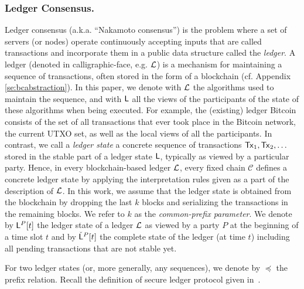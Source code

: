 \subsubsection{Ledger Consensus.}
Ledger consensus (a.k.a. ``Nakamoto consensus'') is the problem where a set of servers
(or nodes) operate continuously accepting inputs
that are called transactions and incorporate them in a public data
structure called the {\em ledger}.
A ledger (denoted in calligraphic-face, e.g. $\mathcal{L}$) is a mechanism for maintaining a sequence of transactions, often
stored in the form of a blockchain (cf. Appendix \ref{se:bcabstraction}). In this paper, we denote with $\mathcal{L}$
the algorithms used to maintain the sequence, and with $\mathsf{L}$ all the views of the
participants of the state of these algorithms when being executed. For example, the (existing) ledger Bitcoin
consists of the set of all transactions that ever took place in the Bitcoin network, the current UTXO set, as
well as the local views of all the participants.
In contrast, we call a \emph{ledger state} a concrete sequence of transactions $\mathsf{Tx}_1,\mathsf{Tx}_2,\dots$ stored in the stable
part of a ledger state $\mathsf{L}$, typically as viewed by a particular party. Hence, in every blockchain-based ledger $\mathcal{L}$,
every fixed chain $\mathcal{C}$ defines a concrete ledger state by applying the interpretation rules given as a part of the
description of $\mathcal{L}$. In this work, we assume that the ledger state is obtained from the blockchain by dropping the last $k$ blocks
and serializing the transactions in the remaining blocks. We refer to $k$ as the \emph{common-prefix parameter}.
We denote by $\mathsf{L}^P[t]$ the ledger state of a ledger $\mathcal{L}$ as viewed by a party $P$ at the beginning of a time slot $t$
and by ${\check {\mathsf{L}}}^{P}[t]$ the complete state of the ledger (at time $t$) including all pending transactions that are not stable yet.


For two ledger states (or, more generally, any sequences), we denote by $\preceq$ the prefix relation.
Recall the definition of secure ledger protocol given in~\cite{sok}.


